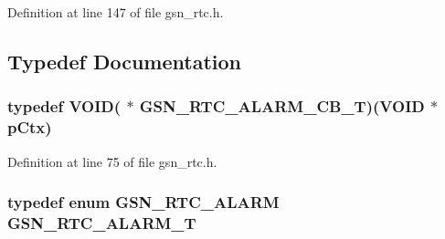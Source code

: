 Definition at line 147 of file gsn\_\-rtc.h.



\subsection{Typedef Documentation}
\hypertarget{a00582_a624c15b10850050c5064e7949e4bd15f}{
\subsubsection[{GSN\_\-RTC\_\-ALARM\_\-CB\_\-T}]{\setlength{\rightskip}{0pt plus 5cm}typedef VOID( $\ast$ {\bf GSN\_\-RTC\_\-ALARM\_\-CB\_\-T})(VOID $\ast$pCtx)}}
\label{a00582_a624c15b10850050c5064e7949e4bd15f}


Definition at line 75 of file gsn\_\-rtc.h.

\hypertarget{a00582_a55a97ef6cc63c0ef0c4032ed2324bd2f}{
\subsubsection[{GSN\_\-RTC\_\-ALARM\_\-T}]{\setlength{\rightskip}{0pt plus 5cm}typedef enum {\bf GSN\_\-RTC\_\-ALARM} {\bf GSN\_\-RTC\_\-ALARM\_\-T}}}
\label{a00582_a55a97ef6cc63c0ef0c4032ed2324bd2f}


